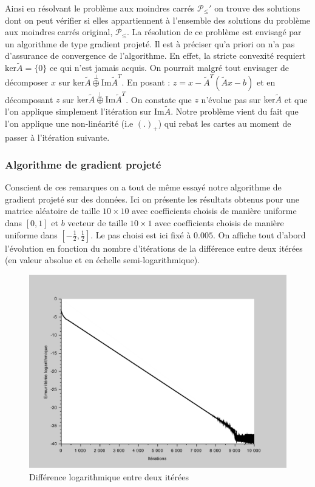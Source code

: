 \documentclass[10pt,a4paper]{article}
\begin{document}
Ainsi en résolvant le problème aux moindres carrés $\mathcal{P}_{\le}'$ on trouve des solutions dont on peut vérifier si elles appartiennent à l'ensemble des solutions du problème aux moindres carrés original, $\mathcal{P}_{\le}$. La résolution de ce problème est envisagé par un algorithme de type gradient projeté. Il est à préciser qu'a priori on n'a pas d'assurance de convergence de l'algorithme. En effet, la stricte convexité requiert $\text{ker}\tilde{A}= \lbrace 0 \rbrace$ ce qui n'est jamais acquis. On pourrait malgré tout envisager de décomposer $x$ sur $\text{ker}\tilde{A} \overset{\perp}{\oplus} \text{Im}\tilde{A}^T$. En posant : $z = x -\tilde{A}^T(\tilde{A}x -b)$ et en décomposant $z$ sur $\text{ker}\tilde{A} \overset{\perp}{\oplus} \text{Im}\tilde{A}^T$. On constate que $z$ n'évolue pas sur $\text{ker}\tilde{A}$ et que l'on applique simplement l'itération sur $\text{Im}\tilde{A}$. Notre problème vient du fait que l'on applique une non-linéarité (i.e $(.)_+$) qui rebat les cartes au moment de passer à l'itération suivante.
\subsubsection{Algorithme de gradient projeté}
Conscient de ces remarques on a tout de même essayé notre algorithme de gradient projeté sur des données. Ici on présente les résultats obtenus pour une matrice aléatoire de taille $10 \times 10$ avec coefficients choisis de manière uniforme dans $[0,1]$ et $b$ vecteur de taille $10 \times 1$ avec coefficients choisis de manière uniforme dans $[-\frac{1}{2}, \frac{1}{2}]$. Le pas choisi est ici fixé à $0.005$. On affiche tout d'abord l'évolution en fonction du nombre d'itérations de la différence entre deux itérées (en valeur absolue et en échelle semi-logarithmique).

\begin{figure}[H]
\centering
\includegraphics[scale=0.5]{gradproj_erreur.pdf}
\caption{Différence logarithmique entre deux itérées}
\end{figure}
\end{document}
